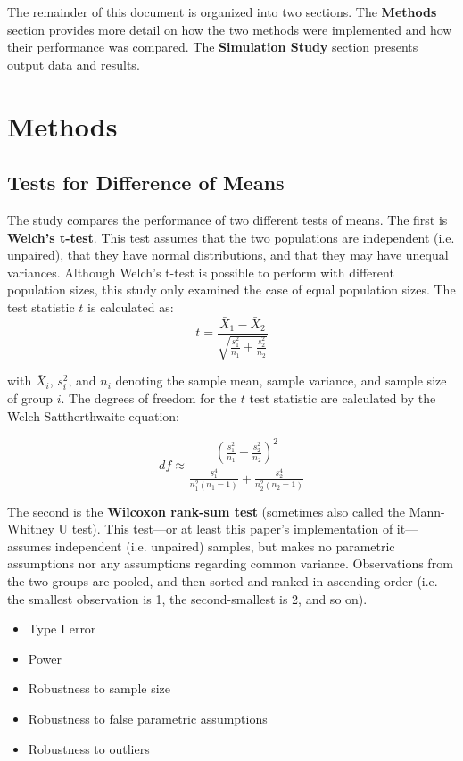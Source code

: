 \documentclass{report}
\begin{document}
The remainder of this document is organized into two sections. The
\textbf{Methods} section provides more detail on how the two methods were
implemented and how their performance was compared. The \textbf{Simulation
Study} section presents output data and results.

\section*{Methods}

\subsection*{Tests for Difference of Means}
The study compares the performance of two different tests of means. The first
is \textbf{Welch's t-test}. This test assumes that the two populations
are independent (i.e. unpaired), that they have normal distributions, and that
they may have unequal variances. Although Welch's t-test is
possible to perform with different population sizes, this study only examined
the case of equal population sizes. The test statistic $t$ is calculated as:
\begin{equation}
t = \frac{\bar{X}_1 - \bar{X}_2}{\sqrt{\frac{s^2_1}{n_1} + \frac{s^2_2}{n_2}}}
\end{equation}

with $\bar{X}_i$, $s^2_i$, and $n_i$ denoting the sample mean, sample variance, and
sample size of group $i$. The degrees of freedom for the $t$ test statistic are
calculated by the Welch-Sattherthwaite equation:

\begin{equation}
df \approx \frac{\left(\frac{s^2_1}{n_1} + \frac{s^2_2}{n_2}
\right)^2}{\frac{s^4_1}{n^2_1(n_1 - 1)} + \frac{s^4_2}{n^2_2(n_2 - 1)}}
\end{equation}

The second is the \textbf{Wilcoxon rank-sum test} (sometimes also called
the Mann-Whitney U test). This test---or at least this paper's implementation of
it---assumes independent (i.e. unpaired) samples, but makes no parametric
assumptions nor any assumptions regarding common variance. Observations from the
two groups are pooled, and then sorted and ranked in ascending order (i.e. the smallest
observation is 1, the second-smallest is 2, and so on). 
\begin{itemize}
\item Type I error
\item Power 
\item Robustness to sample size
\item Robustness to false parametric assumptions
\item Robustness to outliers
\end{itemize}
\end{document}
